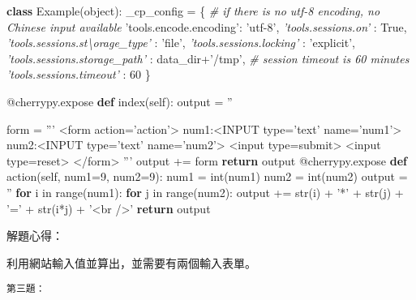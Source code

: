 \documentclass[]{article}
\newenvironment{Shaded}{}{}
\newcommand{\KeywordTok}[1]{\textcolor[rgb]{0.00,0.44,0.13}{\textbf{{#1}}}}
\newcommand{\DataTypeTok}[1]{\textcolor[rgb]{0.56,0.13,0.00}{{#1}}}
\newcommand{\DecValTok}[1]{\textcolor[rgb]{0.25,0.63,0.44}{{#1}}}
\newcommand{\StringTok}[1]{\textcolor[rgb]{0.25,0.44,0.63}{{#1}}}
\newcommand{\CommentTok}[1]{\textcolor[rgb]{0.38,0.63,0.69}{\textit{{#1}}}}
\newcommand{\OtherTok}[1]{\textcolor[rgb]{0.00,0.44,0.13}{{#1}}}
\newcommand{\NormalTok}[1]{{#1}}
\begin{document}
\begin{Shaded}
\begin{Highlighting}[]
\KeywordTok{class} \NormalTok{Example(}\DataTypeTok{object}\NormalTok{):}
\NormalTok{_cp_config = \{}
\CommentTok{# if there is no utf-8 encoding, no Chinese input available}
\StringTok{'tools.encode.encoding'}\NormalTok{: }\StringTok{'utf-8'}\NormalTok{,}
\CommentTok{'tools.sessions.on'} \NormalTok{: }\OtherTok{True}\NormalTok{,}
\CommentTok{'tools.sessions.st\textbackslash{}orage_type'} \NormalTok{: }\StringTok{'file'}\NormalTok{,}
\CommentTok{'tools.sessions.locking'} \NormalTok{: }\StringTok{'explicit'}\NormalTok{,}
\CommentTok{'tools.sessions.storage_path'} \NormalTok{: data_dir+}\StringTok{'/tmp'}\NormalTok{,}
\CommentTok{# session timeout is 60 minutes}
\CommentTok{'tools.sessions.timeout'} \NormalTok{: }\DecValTok{60}
\NormalTok{\}}

\OtherTok{@cherrypy.expose}
\KeywordTok{def} \NormalTok{index(}\OtherTok{self}\NormalTok{):}
    \NormalTok{output = }\StringTok{''}

    \NormalTok{form = }\StringTok{'''}
\StringTok{    <form action='action'>}
\StringTok{    num1:<INPUT type='text' name='num1'>}
\StringTok{    num2:<INPUT type='text'  name='num2'>}
\StringTok{    <input type=submit>}
\StringTok{    <input type=reset>}
\StringTok{    </form>}
\StringTok{    '''}
    \NormalTok{output += form}
    \KeywordTok{return} \NormalTok{output}
\OtherTok{@cherrypy.expose}
\KeywordTok{def} \NormalTok{action(}\OtherTok{self}\NormalTok{, num1=}\DecValTok{9}\NormalTok{, num2=}\DecValTok{9}\NormalTok{):}
    \NormalTok{num1 = }\DataTypeTok{int}\NormalTok{(num1)}
    \NormalTok{num2 = }\DataTypeTok{int}\NormalTok{(num2)}
    \NormalTok{output = }\StringTok{''}
    \KeywordTok{for} \NormalTok{i in }\DataTypeTok{range}\NormalTok{(num1):}
        \KeywordTok{for} \NormalTok{j in }\DataTypeTok{range}\NormalTok{(num2):}
            \NormalTok{output += }\DataTypeTok{str}\NormalTok{(i) + }\StringTok{'*'} \NormalTok{+ }\DataTypeTok{str}\NormalTok{(j) + }\StringTok{'='} \NormalTok{+ }\DataTypeTok{str}\NormalTok{(i*j) + }\StringTok{'<br />'}
    \KeywordTok{return} \NormalTok{output}
\end{Highlighting}
\end{Shaded}

解題心得：

利用網站輸入值並算出，並需要有兩個輸入表單。

\begin{verbatim}
第三題：
\end{verbatim}
\end{document}
